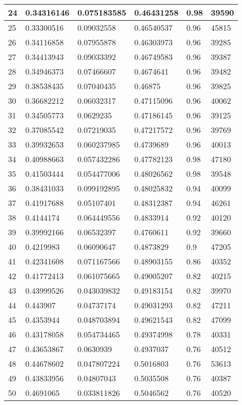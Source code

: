 \begin{longtable}{|l|l|l|l|l|l|}
24 & 0.34316146 & 0.075183585 & 0.46431258 & 0.98 & 39590 \\ \hline 
25 & 0.33300516 & 0.09032558 & 0.46540537 & 0.96 & 45815 \\ \hline 
26 & 0.34116858 & 0.07955878 & 0.46303973 & 0.96 & 39285 \\ \hline 
27 & 0.34413943 & 0.09033392 & 0.46749583 & 0.96 & 39387 \\ \hline 
28 & 0.34946373 & 0.07466607 & 0.4674641 & 0.96 & 39482 \\ \hline 
29 & 0.38538435 & 0.07040435 & 0.46875 & 0.96 & 39825 \\ \hline 
30 & 0.36682212 & 0.06032317 & 0.47115096 & 0.96 & 40062 \\ \hline 
31 & 0.34505773 & 0.0629235 & 0.47186145 & 0.96 & 39125 \\ \hline 
32 & 0.37085542 & 0.07219035 & 0.47217572 & 0.96 & 39769 \\ \hline 
33 & 0.39932653 & 0.060237985 & 0.4739689 & 0.96 & 40013 \\ \hline 
34 & 0.40988663 & 0.057432286 & 0.47782123 & 0.98 & 47180 \\ \hline 
35 & 0.41503444 & 0.054477006 & 0.48026562 & 0.98 & 39548 \\ \hline 
36 & 0.38431033 & 0.099192895 & 0.48025832 & 0.94 & 40099 \\ \hline 
37 & 0.41917688 & 0.05107401 & 0.48312387 & 0.94 & 46261 \\ \hline 
38 & 0.4144174 & 0.064449556 & 0.4833914 & 0.92 & 40120 \\ \hline 
39 & 0.39992166 & 0.06532397 & 0.4760611 & 0.92 & 39660 \\ \hline 
40 & 0.4219983 & 0.06090647 & 0.4873829 & 0.9 & 47205 \\ \hline 
41 & 0.42341608 & 0.071167566 & 0.48903155 & 0.86 & 40352 \\ \hline 
42 & 0.41772413 & 0.061075665 & 0.49005207 & 0.82 & 40215 \\ \hline 
43 & 0.43999526 & 0.043039832 & 0.49183154 & 0.82 & 39970 \\ \hline 
44 & 0.443907 & 0.04737174 & 0.49031293 & 0.82 & 47211 \\ \hline 
45 & 0.4353944 & 0.048703894 & 0.49621543 & 0.82 & 47099 \\ \hline 
46 & 0.43178058 & 0.054734465 & 0.49374998 & 0.78 & 40331 \\ \hline 
47 & 0.43653867 & 0.0630939 & 0.4937037 & 0.76 & 40512 \\ \hline 
48 & 0.44678602 & 0.047807224 & 0.5016803 & 0.76 & 53613 \\ \hline 
49 & 0.43833956 & 0.04807043 & 0.5035508 & 0.76 & 40387 \\ \hline 
50 & 0.4691065 & 0.033811826 & 0.5046562 & 0.76 & 40520 \\ \hline 
\end{longtable}